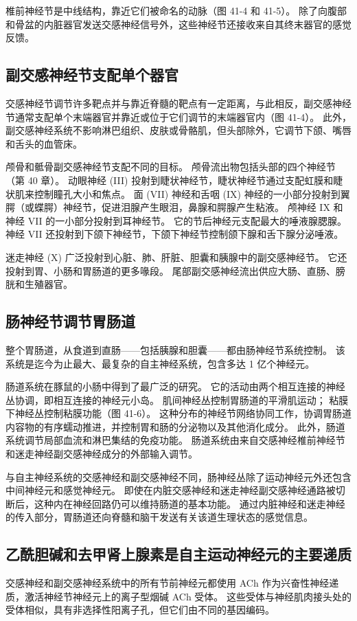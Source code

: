 椎前神经节是中线结构，靠近它们被命名的动脉（图 41-4 和 41-5）。 除了向腹部和骨盆的内脏器官发送交感神经信号外，这些神经节还接收来自其终末器官的感觉反馈。

\subsection{副交感神经节支配单个器官}
交感神经节调节许多靶点并与靠近脊髓的靶点有一定距离，与此相反，副交感神经节通常支配单个末端器官并靠近或位于它们调节的末端器官内（图 41-4）。 此外，副交感神经系统不影响淋巴组织、皮肤或骨骼肌，但头部除外，它调节下颌、嘴唇和舌头的血管床。

颅骨和骶骨副交感神经节支配不同的目标。 颅骨流出物包括头部的四个神经节（第 40 章）。 动眼神经 (III) 投射到睫状神经节，睫状神经节通过支配虹膜和睫状肌来控制瞳孔大小和焦点。 面 (VII) 神经和舌咽 (IX) 神经的一小部分投射到翼腭（或蝶腭）神经节，促进泪腺产生眼泪，鼻腺和腭腺产生粘液。 颅神经 IX 和神经 VII 的一小部分投射到耳神经节。 它的节后神经元支配最大的唾液腺腮腺。 神经 VII 还投射到下颌下神经节，下颌下神经节控制颌下腺和舌下腺分泌唾液。

迷走神经 (X) 广泛投射到心脏、肺、肝脏、胆囊和胰腺中的副交感神经节。 它还投射到胃、小肠和胃肠道的更多喙段。 尾部副交感神经流出供应大肠、直肠、膀胱和生殖器官。

\subsection{肠神经节调节胃肠道}
整个胃肠道，从食道到直肠——包括胰腺和胆囊——都由肠神经节系统控制。 该系统是迄今为止最大、最复杂的自主神经系统，包含多达 1 亿个神经元。

肠道系统在豚鼠的小肠中得到了最广泛的研究。 它的活动由两个相互连接的神经丛协调，即相互连接的神经元小岛。 肌间神经丛控制胃肠道的平滑肌运动； 粘膜下神经丛控制粘膜功能（图 41-6）。 这种分布的神经节网络协同工作，协调胃肠道内容物的有序蠕动推进，并控制胃和肠的分泌物以及其他消化成分。 此外，肠道系统调节局部血流和淋巴集结的免疫功能。 肠道系统由来自交感神经椎前神经节和迷走神经副交感神经成分的外部输入调节。

与自主神经系统的交感神经和副交感神经不同，肠神经丛除了运动神经元外还包含中间神经元和感觉神经元。 即使在内脏交感神经和迷走神经副交感神经通路被切断后，这种内在神经回路仍可以维持肠道的基本功能。 通过内脏神经和迷走神经的传入部分，胃肠道还向脊髓和脑干发送有关该道生理状态的感觉信息。

\subsection{乙酰胆碱和去甲肾上腺素是自主运动神经元的主要递质}
交感神经和副交感神经系统中的所有节前神经元都使用 ACh 作为兴奋性神经递质，激活神经节神经元上的离子型烟碱 ACh 受体。 这些受体与神经肌肉接头处的受体相似，具有非选择性阳离子孔，但它们由不同的基因编码。

